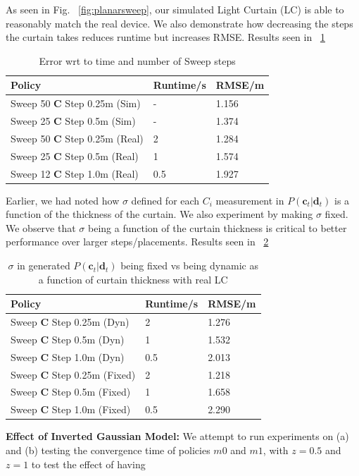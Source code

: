 As seen in Fig. ~\ref{fig:planarsweep}, our simulated Light Curtain (LC) is able to reasonably match the real device. We also demonstrate how decreasing the steps the curtain takes reduces runtime but increases RMSE. Results seen in ~\ref{table:t1}

\begin{table}[h]
   \centering
   \begin{tabular}{|l|l|l|}
   \hline
    Policy&  Runtime/s&  RMSE/m\\ \hline
    Sweep 50 $\mathbf{C}$ Step 0.25m (Sim) &-  &1.156  \\ \hline
    Sweep 25 $\mathbf{C}$ Step 0.5m  (Sim) &-  &1.374  \\ \hline
    Sweep 50 $\mathbf{C}$ Step 0.25m (Real) &2  &1.284  \\ \hline
    Sweep 25 $\mathbf{C}$ Step 0.5m  (Real) &1  &1.574  \\ \hline
    Sweep 12 $\mathbf{C}$ Step 1.0m (Real) &0.5  &1.927  \\ \hline
   \end{tabular}
   \caption{Error wrt to time and number of Sweep steps}
   \label{table:t1}
\end{table}

Earlier, we had noted how $\sigma$ defined for each $C_{i}$ measurement in $P\left(\mathbf{c}_{t}|\mathbf{d}_{t}\right)$ is a function of the thickness of the curtain. We also experiment by making $\sigma$ fixed. We observe that $\sigma$ being a function of the curtain thickness is critical to better performance over larger steps/placements. Results seen in ~\ref{table:t2}

\begin{table}[h]
   \centering
   \begin{tabular}{|l|l|l|}
   \hline
    Policy&  Runtime/s&  RMSE/m\\ \hline
    Sweep $\mathbf{C}$ Step 0.25m (Dyn) &2  &1.276  \\ \hline
    Sweep $\mathbf{C}$ Step 0.5m  (Dyn) &1  &1.532  \\ \hline
    Sweep $\mathbf{C}$ Step 1.0m (Dyn) &0.5  &2.013  \\ \hline
    Sweep $\mathbf{C}$ Step 0.25m (Fixed) &2  &1.218  \\ \hline
    Sweep $\mathbf{C}$ Step 0.5m  (Fixed) &1  &1.658  \\ \hline
    Sweep $\mathbf{C}$ Step 1.0m (Fixed) &0.5  &2.290  \\ \hline
   \end{tabular}
   \caption{$\sigma$ in generated $P\left(\mathbf{c}_{t}|\mathbf{d}_{t}\right)$ being fixed vs being dynamic as a function of curtain thickness with real LC}
   \label{table:t2}
\end{table}

\textbf{Effect of Inverted Gaussian Model:} We attempt to run experiments on (a) and (b) testing the convergence time of policies $m0$ and $m1$, with $z=0.5$ and $z=1$ to test the effect of having 


